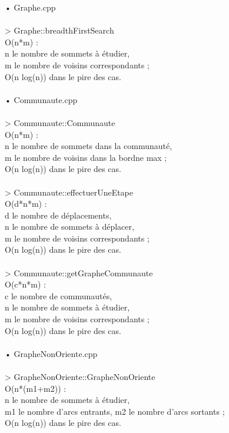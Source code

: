 \begin{titlepage}
\vspace{1cm}
{
• Graphe.cpp
\\  \\
> Graphe::breadthFirstSearch \\ 
O(n*m) : \\
n le nombre de sommets à étudier, \\
m le nombre de voisins correspondants ; \\
O(n log(n)) dans le pire des cas. \\ \\

• Communaute.cpp
\\  \\
> Communaute::Communaute  \\
O(n*m) : \\
n le nombre de sommets dans la communauté, \\
m le nombre de voisins dans la bordne max ; \\
O(n log(n)) dans le pire des cas. \\ 
 \\
> Communaute::effectuerUneEtape \\
O(d*n*m) : \\
d le nombre de déplacements, \\
n le nombre de sommets à déplacer, \\
m le nombre de voisins correspondants ; \\
O(n log(n)) dans le pire des cas. \\ 
 \\
> Communaute::getGrapheCommunaute \\
O(c*n*m) : \\
c le nombre de communautés, \\
n le nombre de sommets à étudier, \\
m le nombre de voisins correspondants ; \\ 
O(n log(n)) dans le pire des cas.  \\  \\

• GrapheNonOriente.cpp
 \\  \\
> GrapheNonOriente::GrapheNonOriente \\
O(n*(m1+m2)) : \\
n le nombre de sommets à étudier, \\
m1 le nombre d'arcs entrants, 
m2 le nombre d'arcs sortants ; \\
O(n log(n)) dans le pire des cas. \\ \\

}
\end{titlepage}
